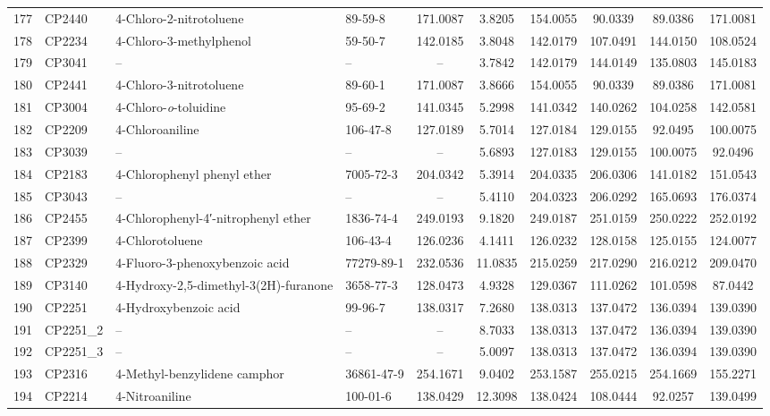 \begin{longtable}{clllcccccc}
177 & CP2440 & 4-Chloro-2-nitrotoluene & 89-59-8 & 171.0087 & 3.8205 & 154.0055 & 90.0339 & 89.0386 & 171.0081 \\ 
178 & CP2234 & 4-Chloro-3-methylphenol & 59-50-7 & 142.0185 & 3.8048 & 142.0179 & 107.0491 & 144.0150 & 108.0524 \\ 
179 & CP3041 & – & – & – & 3.7842 & 142.0179 & 144.0149 & 135.0803 & 145.0183 \\ 
180 & CP2441 & 4-Chloro-3-nitrotoluene & 89-60-1 & 171.0087 & 3.8666 & 154.0055 & 90.0339 & 89.0386 & 171.0081 \\ 
181 & CP3004 & 4-Chloro-\textit{o}-toluidine & 95-69-2 & 141.0345 & 5.2998 & 141.0342 & 140.0262 & 104.0258 & 142.0581 \\ 
182 & CP2209 & 4-Chloroaniline & 106-47-8 & 127.0189 & 5.7014 & 127.0184 & 129.0155 & 92.0495 & 100.0075 \\ 
183 & CP3039 & – & – & – & 5.6893 & 127.0183 & 129.0155 & 100.0075 & 92.0496 \\ 
184 & CP2183 & 4-Chlorophenyl phenyl ether & 7005-72-3 & 204.0342 & 5.3914 & 204.0335 & 206.0306 & 141.0182 & 151.0543 \\ 
185 & CP3043 & – & – & – & 5.4110 & 204.0323 & 206.0292 & 165.0693 & 176.0374 \\ 
186 & CP2455 & 4-Chlorophenyl-4′-nitrophenyl ether & 1836-74-4 & 249.0193 & 9.1820 & 249.0187 & 251.0159 & 250.0222 & 252.0192 \\ 
187 & CP2399 & 4-Chlorotoluene & 106-43-4 & 126.0236 & 4.1411 & 126.0232 & 128.0158 & 125.0155 & 124.0077 \\ 
188 & CP2329 & 4-Fluoro-3-phenoxybenzoic acid & 77279-89-1 & 232.0536 & 11.0835 & 215.0259 & 217.0290 & 216.0212 & 209.0470 \\ 
189 & CP3140 & 4-Hydroxy-2,5-dimethyl-3(2H)-furanone & 3658-77-3 & 128.0473 & 4.9328 & 129.0367 & 111.0262 & 101.0598 & 87.0442 \\ 
190 & CP2251 & 4-Hydroxybenzoic acid & 99-96-7 & 138.0317 & 7.2680 & 138.0313 & 137.0472 & 136.0394 & 139.0390 \\ 
191 & CP2251\_2 & – & – & – & 8.7033 & 138.0313 & 137.0472 & 136.0394 & 139.0390 \\ 
192 & CP2251\_3 & – & – & – & 5.0097 & 138.0313 & 137.0472 & 136.0394 & 139.0390 \\ 
193 & CP2316 & 4-Methyl-benzylidene camphor & 36861-47-9 & 254.1671 & 9.0402 & 253.1587 & 255.0215 & 254.1669 & 155.2271 \\ 
194 & CP2214 & 4-Nitroaniline & 100-01-6 & 138.0429 & 12.3098 & 138.0424 & 108.0444 & 92.0257 & 139.0499 \\ 

\end{longtable}
